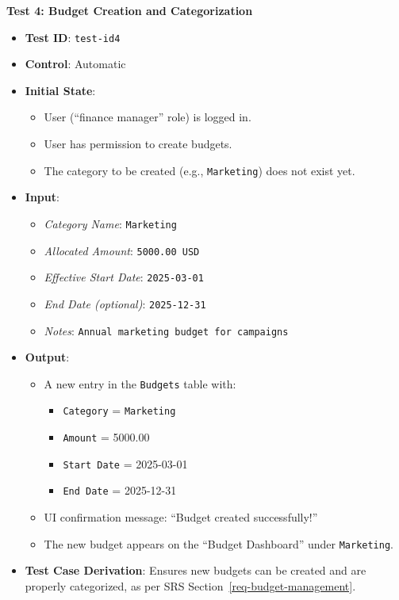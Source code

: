 \documentclass[12pt, titlepage]{article}
\begin{document}
\textbf{Test 4: Budget Creation and Categorization}
\begin{itemize}
    \item \textbf{Test ID}: \texttt{test-id4}
    \item \textbf{Control}: Automatic
    \item \textbf{Initial State}:
    \begin{itemize}
        \item User (``finance manager'' role) is logged in.
        \item User has permission to create budgets.
        \item The category to be created (e.g., \texttt{Marketing}) does not exist yet.
    \end{itemize}
    \item \textbf{Input}:
    \begin{itemize}
        \item \textit{Category Name}: \texttt{Marketing}
        \item \textit{Allocated Amount}: \texttt{5000.00 USD}
        \item \textit{Effective Start Date}: \texttt{2025-03-01}
        \item \textit{End Date (optional)}: \texttt{2025-12-31}
        \item \textit{Notes}: \texttt{Annual marketing budget for campaigns}
    \end{itemize}
    \item \textbf{Output}:
    \begin{itemize}
        \item A new entry in the \texttt{Budgets} table with:
        \begin{itemize}
            \item \texttt{Category} = \texttt{Marketing}
            \item \texttt{Amount} = 5000.00
            \item \texttt{Start Date} = 2025-03-01
            \item \texttt{End Date} = 2025-12-31
        \end{itemize}
        \item UI confirmation message: ``Budget created successfully!''
        \item The new budget appears on the ``Budget Dashboard'' under \texttt{Marketing}.
    \end{itemize}
    \item \textbf{Test Case Derivation}:
    Ensures new budgets can be created and are properly categorized, as per SRS Section~\ref{req-budget-management}.

\end{itemize}
\end{document}
